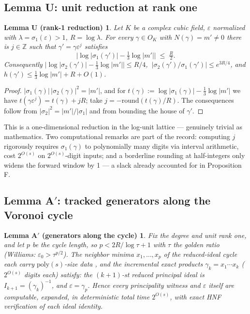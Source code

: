 \documentclass[11pt]{amsart}
\theoremstyle{plain}
\newtheorem*{lemmaU}{Lemma U (rank-1 reduction)}
\newtheorem*{lemmaAprime}{Lemma A$'$ (generators along the cycle)}
\theoremstyle{remark}
\begin{document}
\subsection{Lemma U: unit reduction at rank one}\label{sec:lemU}

\begin{lemmaU}
Let $K$ be a complex cubic field, $\varepsilon$ normalized with
$\lambda = \sigma_1(\varepsilon) > 1$, $R = \log\lambda$. For every
$\gamma \in O_K$ with $N(\gamma) = m' \ne 0$ there is
$j \in \mathbb{Z}$ such that $\gamma' = \gamma\varepsilon^j$ satisfies
\[
\bigl|\log|\sigma_1(\gamma')| - \tfrac13\log|m'|\bigr| \;\le\;
\tfrac{R}{2}.
\]
Consequently
$\bigl|\log|\sigma_2(\gamma')| - \tfrac13\log|m'|\bigr| \le R/4$,
$\ |\sigma_2(\gamma')/\sigma_1(\gamma')| \le e^{3R/4}$, and
$h(\gamma') \le \tfrac13\log|m'| + R + O(1)$.
\end{lemmaU}

\begin{proof}
$|\sigma_1(\gamma)|\,|\sigma_2(\gamma)|^2 = |m'|$, and for
$t(\gamma) := \log|\sigma_1(\gamma)| - \tfrac13\log|m'|$ we have
$t(\gamma\varepsilon^j) = t(\gamma) + jR$; take
$j = -\mathrm{round}(t(\gamma)/R)$. The consequences follow from
$|\sigma_2|^2 = |m'|/|\sigma_1|$ and from bounding the house of
$\gamma'$.
\end{proof}

This is a one-dimensional reduction in the log-unit lattice ---
genuinely trivial as mathematics. Two computational remarks are part
of the record: computing $j$ rigorously requires $\sigma_1(\gamma)$
to polynomially many digits via interval arithmetic, cost $2^{O(s)}$
on $2^{O(s)}$-digit inputs; and a borderline rounding at
half-integers only widens the forward window by 1 --- a slack already
accounted for in Proposition F.

\subsection{Lemma A$'$: tracked generators along the Voronoi cycle}
\label{sec:lemAprime}

\begin{lemmaAprime}
Fix the degree and unit rank one, and let $p$ be the cycle length, so
$p < 2R/\log\tau + 1$ with $\tau$ the golden ratio (Williams:
$\varepsilon_0 > \tau^{p/2}$). The neighbor minima $x_1, \ldots, x_p$
of the reduced-ideal cycle each carry $\mathrm{poly}(s)$-size data
\cite[Prop.~2.11]{BW88}, and the incremental exact products
$\gamma_k = x_1\cdots x_k$ ($2^{O(s)}$ digits each) satisfy: the
$(k{+}1)$-st reduced principal ideal is $I_{k+1} = (\gamma_k)^{-1}$,
and $\varepsilon = \gamma_p$. Hence every principality witness and
$\varepsilon$ itself are computable, expanded, in deterministic total
time $2^{O(s)}$, with exact HNF verification of each ideal identity.
\end{lemmaAprime}
\end{document}
